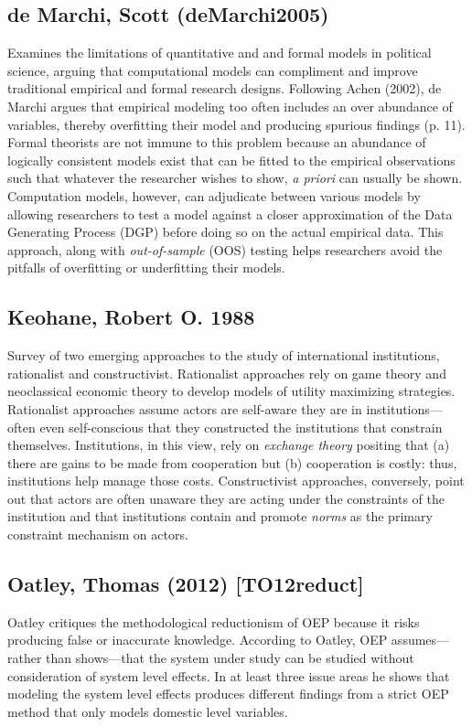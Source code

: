 \documentclass[11pt]{article}
\begin{document}
\subsection{de Marchi, Scott (deMarchi2005)}
\label{sec-2-4}
Examines the limitations of quantitative and and formal models in
political science, arguing that computational models can compliment
and improve traditional empirical and formal research designs.
Following Achen (2002), de Marchi argues that empirical modeling too
often includes an over abundance of variables, thereby overfitting
their model and producing spurious findings (p. 11). Formal theorists
are not immune to this problem because an abundance of logically
consistent models exist that can be fitted to the empirical
observations such that whatever the researcher wishes to show, \emph{a
priori} can usually be shown. Computation models, however, can
adjudicate between various models by allowing researchers to test a
model against a closer approximation of the Data Generating Process
(DGP) before doing so on the actual empirical data. This approach,
along with \emph{out-of-sample} (OOS) testing helps researchers avoid the
pitfalls of overfitting or underfitting their models.   
\subsection{Keohane, Robert O. 1988}
\label{sec-2-5}
Survey of two emerging approaches to the study of international
institutions, rationalist and constructivist. Rationalist approaches
rely on game theory and neoclassical economic theory to develop models
of utility maximizing strategies. Rationalist approaches assume actors
are self-aware they are in institutions---often even self-conscious
that they constructed the institutions that constrain
themselves. Institutions, in this view, rely on \emph{exchange theory}
positing that (a) there are gains to be made from cooperation but (b)
cooperation is costly: thus, institutions help manage those
costs. Constructivist approaches, conversely, point out that actors
are often unaware they are acting under the constraints of the
institution and that institutions contain and promote \emph{norms} as the
primary constraint mechanism on actors. 
\subsection{Oatley, Thomas (2012) [TO12reduct]}
\label{sec-2-6}
Oatley critiques the methodological reductionism of OEP because it
risks producing false or inaccurate knowledge. According to Oatley,
OEP assumes---rather than shows---that the system under study can be
studied without consideration of system level effects. In at least
three issue areas he shows that modeling the system level effects
produces different findings from a strict OEP method that only models
domestic level variables. 
\end{document}
